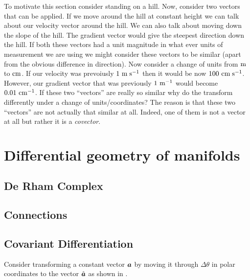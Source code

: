 To motivate this section consider standing on a hill. Now, consider two
vectors that can be applied. If we move around the hill at constant height we
can talk about our velocity vector around the hill. We can also talk about
moving down the slope of the hill. The gradient vector would give the steepest
direction down the hill. If both these vectors had a unit magnitude in what
ever units of measurement we are using we might consider these vectors to be
similar (apart from the obvious difference in direction). Now consider a
change of units \eg from $\mathrm{m}$ to $\mathrm{cm}$. If our velocity was prevoiusly
$ 1~\mathrm{\mathrm{m}\thickspace\mathrm{s}^{-1}} $ then it would be now $ 100~\mathrm{\mathrm{cm}\thickspace\mathrm{s}^{-1}} $. However, our
gradient vector that was previously $ 1~\mathrm{\mathrm{m}^{-1}} $ would become
$ 0.01~\mathrm{\mathrm{cm}^{-1}} $. If these two ``vectors'' are really so similar why do
the transform differently under a change of units/coordinates? The reason is
that these two ``vectors'' are not actually that similar at all. Indeed, one
of them is not a vector at all but rather it is a \emph{covector}.

\section{Differential geometry of manifolds}

\subsection{De Rham Complex}



\subsection{Connections}


\subsection{Covariant Differentiation}

Consider transforming a constant vector $ \boldsymbol{a} $ by moving it through $\Delta\theta$ in polar coordinates to the vector $\hat{ \boldsymbol{a} }$ as shown in .

